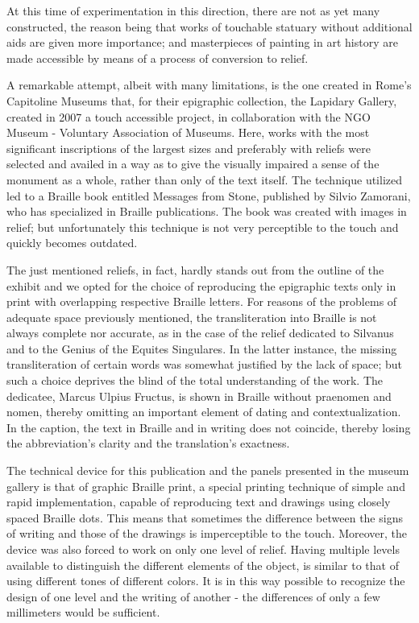 \documentclass[amsthm,ebook]{saparticle}
\begin{document}
At this time of experimentation in this direction, there are not as yet many constructed, the reason being that works of
touchable statuary without additional aids are given more importance; and masterpieces of painting in art history are
made accessible by means of a process of conversion to relief.

A remarkable attempt, albeit with many limitations, is the one created in Rome’s Capitoline Museums that, for their
epigraphic collection, the Lapidary Gallery, created in 2007 a touch accessible project, in collaboration with the NGO
Museum - Voluntary Association of Museums. Here, works with the most significant inscriptions of the largest sizes and
preferably with reliefs were selected and availed in a way as to give the visually impaired a sense of the monument as
a whole, rather than only of the text itself. The technique utilized led to a Braille book entitled Messages from
Stone, published by Silvio Zamorani, who has specialized in Braille publications. The book was created with images in
relief; but unfortunately this technique is not very perceptible to the touch and quickly becomes outdated.

The just mentioned reliefs, in fact, hardly stands out from the outline of the exhibit and we opted for the choice of
reproducing the epigraphic texts only in print with overlapping respective Braille letters. For reasons of the problems
of adequate space previously mentioned, the transliteration into Braille is not always complete nor accurate, as in the
case of the relief dedicated to Silvanus and to the Genius of the Equites Singulares. In the latter instance, the
missing transliteration of certain words was somewhat justified by the lack of space; but such a choice deprives the
blind of the total understanding of the work. The dedicatee, Marcus Ulpius Fructus, is shown in Braille without
praenomen and nomen, thereby omitting an important element of dating and contextualization. In the caption, the text in
Braille and in writing does not coincide, thereby losing the abbreviation’s clarity and the translation’s exactness.

The technical device for this publication and the panels presented in the museum gallery is that of graphic Braille
print, a special printing technique of simple and rapid implementation, capable of reproducing text and drawings using
closely spaced Braille dots. This means that sometimes the difference between the signs of writing and those of the
drawings is imperceptible to the touch. Moreover, the device was also forced to work on only one level of relief.
Having multiple levels available to distinguish the different elements of the object, is similar to that of using
different tones of different colors. It is in this way possible to recognize the design of one level and the writing of
another - the differences of only a few millimeters would be sufficient.
\end{document}

